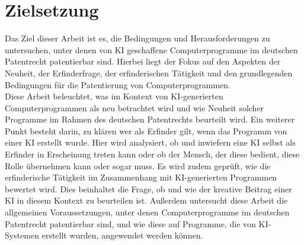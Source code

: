 \section{Zielsetzung\label{sec:objective}}

Das Ziel dieser Arbeit ist es, 
die Bedingungen und Herausforderungen zu untersuchen,
unter denen von KI geschaffene Computerprogramme im deutschen Patentrecht 
patentierbar sind. Hierbei liegt der Fokus auf den Aspekten der Neuheit, 
der Erfinderfrage, der erfinderischen Tätigkeit 
und den grundlegenden Bedingungen für die Patentierung von Computerprogrammen. 
\\

Diese Arbeit beleuchtet, 
was im Kontext von KI-generierten Computerprogrammen 
als neu betrachtet wird 
und wie Neuheit solcher Programme 
im Rahmen des deutschen Patentrechts beurteilt wird. 
Ein weiterer Punkt besteht darin, zu klären 
wer als Erfinder gilt,
wenn das Programm von einer KI erstellt wurde. 
Hier wird analysiert, 
ob und inwiefern eine KI selbst als Erfinder in Erscheinung treten kann 
oder ob der Mensch, der diese bedient, 
diese Rolle übernehmen kann oder sogar muss. 
Es wird zudem geprüft, 
wie die erfinderische Tätigkeit im Zusammenhang 
mit KI-generierten Programmen bewertet wird. 
Dies beinhaltet die Frage, 
ob und wie der kreative Beitrag einer KI in diesem Kontext zu beurteilen ist. 
Außerdem untersucht diese Arbeit die allgemeinen Voraussetzungen, 
unter denen Computerprogramme im deutschen Patentrecht patentierbar sind, 
und wie diese auf Programme, 
die von KI-Systemen erstellt wurden, angewendet werden können. 
\\

